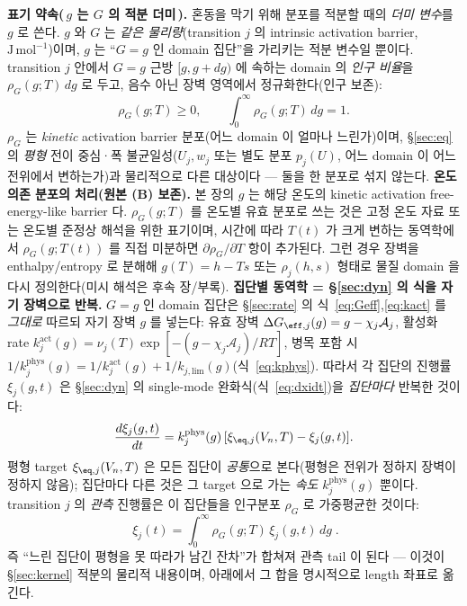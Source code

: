 \textbf{표기 약속(\,$g$ 는 $G$ 의 적분 더미\,).} 혼동을 막기 위해 분포를 적분할 때의 \emph{더미 변수}를
$g$ 로 쓴다. $g$ 와 $G$ 는 \emph{같은 물리량}(transition $j$ 의 intrinsic activation barrier,
$\mathrm{J\,mol^{-1}}$)이며, $g$ 는 ``$G=g$ 인 domain 집단''을 가리키는 적분 변수일 뿐이다. transition
$j$ 안에서 $G=g$ 근방 $[g,g+dg)$ 에 속하는 domain 의 \emph{인구 비율}을 $\rho_G(g;T)\,dg$ 로 두고, 음수
아닌 장벽 영역에서 정규화한다(인구 보존):
\begin{equation}
\rho_G(g;T)\ge0,\qquad \int_0^\infty \rho_G(g;T)\,dg=1.
\label{eq:rho_norm}
\end{equation}
$\rho_G$ 는 \emph{kinetic} activation barrier 분포(어느 domain 이 얼마나 느린가)이며, \S\ref{sec:eq} 의
\emph{평형} 전이 중심·폭 불균일성($U_j,w_j$ 또는 별도 분포 $p_j(U)$, 어느 domain 이 어느 전위에서 변하는가)과
물리적으로 다른 대상이다 — 둘을 한 분포로 섞지 않는다.
\textbf{온도 의존 분포의 처리(원본 (B) 보존).} 본 장의 $g$ 는 해당 온도의 kinetic activation
free-energy-like barrier 다. $\rho_G(g;T)$ 를 온도별 유효 분포로 쓰는 것은 고정 온도 자료 또는 온도별
준정상 해석을 위한 표기이며, 시간에 따라 $T(t)$ 가 크게 변하는 동역학에서 $\rho_G(g;T(t))$ 를 직접 미분하면
$\partial\rho_G/\partial T$ 항이 추가된다. 그런 경우 장벽을 enthalpy/entropy 로 분해해 $g(T)=h-Ts$ 또는
$\rho_j(h,s)$ 형태로 물질 domain 을 다시 정의한다(미시 해석은 후속 장/부록).
\textbf{집단별 동역학 = \S\ref{sec:dyn} 의 식을 자기 장벽으로 반복.} $G=g$ 인 domain 집단은 \S\ref{sec:rate}
의 식~\eqref{eq:Geff},\eqref{eq:kact} 를 \emph{그대로} 따르되 자기 장벽 $g$ 를 넣는다: 유효 장벽
$\Delta G_{\eff,j}(g)=g-\chi_j\mathcal A_j$, 활성화 rate
$k_j^\mathrm{act}(g)=\nu_j(T)\exp[-(g-\chi_j\mathcal A_j)/RT]$, 병목 포함 시
$1/k_j^\mathrm{phys}(g)=1/k_j^\mathrm{act}(g)+1/k_{j,\mathrm{lim}}(g)$(식~\eqref{eq:kphys}). 따라서 각
집단의 진행률 $\xi_j(g,t)$ 은 \S\ref{sec:dyn} 의 single-mode 완화식(식~\eqref{eq:dxidt})을 \emph{집단마다}
반복한 것이다:
\begin{equation}
\frac{d\xi_j(g,t)}{dt}=k_j^\mathrm{phys}(g)\,[\xi_{\eq,j}(V_n,T)-\xi_j(g,t)].
\label{eq:xi_class_ode}
\end{equation}
평형 target $\xi_{\eq,j}(V_n,T)$ 은 모든 집단이 \emph{공통}으로 본다(평형은 전위가 정하지 장벽이 정하지
않음); 집단마다 다른 것은 그 target 으로 가는 \emph{속도} $k_j^\mathrm{phys}(g)$ 뿐이다. transition $j$ 의
\emph{관측} 진행률은 이 집단들을 인구분포 $\rho_G$ 로 가중평균한 것이다:
\begin{equation}
\boxed{\;\xi_j(t)=\int_0^\infty \rho_G(g;T)\,\xi_j(g,t)\,dg\;.}
\label{eq:xi_dist}
\end{equation}
즉 ``느린 집단이 평형을 못 따라가 남긴 잔차''가 합쳐져 관측 tail 이 된다 — 이것이 \S\ref{sec:kernel} 적분의
물리적 내용이며, 아래에서 그 합을 명시적으로 length 좌표로 옮긴다.

